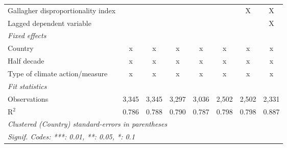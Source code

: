 \begin{tabular}{lccccccc}
   Gallagher disproportionality index                              &               &               &              &             &         & X           & X\\  
   Lagged dependent variable                                       &               &               &              &             &         &             & X\\  
   \emph{Fixed effects}\\
   Country                                                         & x             & x             & x            & x           & x       & x           & x\\  
   Half decade                                                     & x             & x             & x            & x           & x       & x           & x\\  
   Type of climate action/measure                                  & x             & x             & x            & x           & x       & x           & x\\  
   \midrule \emph{Fit statistics}\\
   Observations                                                    & 3,345         & 3,345         & 3,297        & 3,036       & 2,502   & 2,502       & 2,331\\  
   R$^2$                                                           & 0.786         & 0.788         & 0.790        & 0.787       & 0.798   & 0.798       & 0.887\\  
   \midrule
   \multicolumn{8}{l}{\emph{Clustered (Country) standard-errors in parentheses}}\\
   \multicolumn{8}{l}{\emph{Signif. Codes: ***: 0.01, **: 0.05, *: 0.1}}\\
\end{tabular}
\par\endgroup


